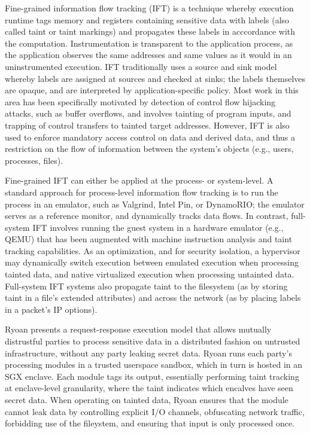 %
Fine-grained information flow tracking (IFT) is a technique whereby execution
runtime tags memory and registers containing sensitive data with labels (also
called taint or taint markings) and propagates these labels in
acccordance with the computation.
%
Instrumentation is transparent to the application process, as the application
observes the same addresses and same values as it would in an uninstrumented
execution.
%
IFT traditionally uses a source and sink model whereby labels are
assigned at sources and checked at sinks; the labels themselves are opaque,
and are interpreted by application-specific policy.
%
Most work in this area has been specifically motivated by detection of control
flow hijacking attacks, such as buffer overflows, and involves tainting of
program inputs, and trapping of control transfers to tainted target addresses.
%
However, IFT is also used to enforce mandatory access control on data and
derived data, and thus a restriction on the flow of information between
the system's objects (e.g., users, processes, files).


Fine-grained IFT can either be applied at the process- or system-level.
%
A standard approach for process-level information flow tracking is to run
the process in an emulator, such as Valgrind, Intel Pin, or DynamoRIO; the
emulator serves as a reference monitor, and dynamically tracks data flows.
%
In contrast, full-system IFT involves running the guest system in a hardware
emulator (e.g., QEMU) that has been augmented with machine instruction analysis
and taint tracking capabilities.
%
As an optimization, and for security isolation, a hypervisor may dynamically
switch execution between emulated execution when processing tainted data, and
native virtualized execution when processing untainted data.
%
Full-system IFT systems also propagate taint to the filesystem (as by storing
taint in a file's extended attributes) and across the network (as by placing
labels in a packet's IP options).


%
Ryoan presents a request-response execution model that allows mutually
distrustful parties to process sensitive data in a distributed fashion on
untrusted infrastructure, without any party leaking secret data.
%
Ryoan runs each party's processing modules in a trusted userspace sandbox,
which in turn is hosted in an SGX enclave.
%
Each module tags its output, essentially performing taint tracking at
enclave-level granularity, where the taint indicates which encalves have seen
secret data.
%
When operating on tainted data, Ryoan ensures that the module cannot leak data
by controlling explicit I/O channels, obfuscating network traffic, forbidding
use of the fileystem, and ensuring that input is only processed once.


